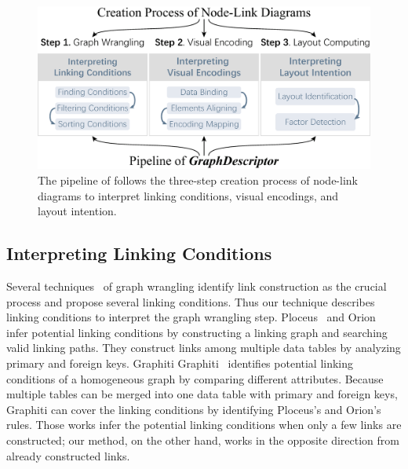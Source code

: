 \begin{figure}
    \centering
    \includegraphics[width=1\columnwidth]{figures/workflow.eps}
    \caption{The pipeline of \textit{\ApproachName} follows the three-step creation process of node-link diagrams to interpret linking conditions, visual encodings, and layout intention.}
    \label{fig:workflow}
\end{figure}


\subsection{Interpreting Linking Conditions}
Several techniques~\cite{DBLP:journals/ivs/LiuNS14, DBLP:journals/ivs/HeerP14, DBLP:journals/tvcg/SrinivasanPEB18} of graph wrangling identify link construction as the crucial process and propose several linking conditions.
Thus our technique describes linking conditions to interpret the graph wrangling step.
Ploceus~\cite{DBLP:journals/ivs/LiuNS14} and Orion~\cite{DBLP:journals/ivs/HeerP14} infer potential linking conditions by constructing a linking graph and searching valid linking paths. They construct links among multiple data tables by analyzing primary and foreign keys.
Graphiti
Graphiti~\cite{DBLP:journals/tvcg/SrinivasanPEB18} identifies potential linking conditions of a homogeneous graph by comparing different attributes.
Because multiple tables can be merged into one data table with primary and foreign keys, Graphiti can cover the linking conditions by identifying Ploceus's and Orion's rules.
Those works infer the potential linking conditions when only a few links are constructed;
our method, on the other hand, works in the opposite direction from already constructed links.

